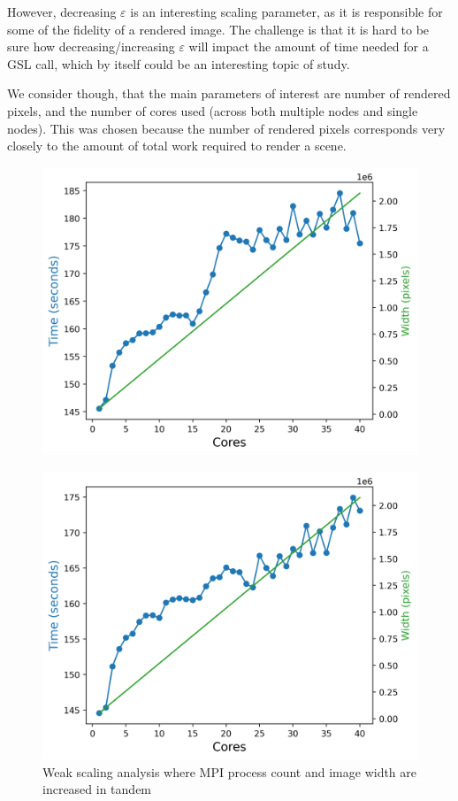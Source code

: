 However, decreasing $\varepsilon$ is an interesting scaling parameter, as it is responsible for some of the fidelity of a rendered image. The challenge is that it is hard to be sure how decreasing/increasing $\varepsilon$ will impact the amount of time needed for a GSL call, which by itself could be an interesting topic of study.

We consider though, that the main parameters of interest are number of rendered pixels, and the number of cores used (across both multiple nodes and single nodes). This was chosen because the number of rendered pixels corresponds very closely to the amount of total work required to render a scene.

\begin{figure}[h]
  \centering
 \begin{minipage}{0.45\linewidth}
  \includegraphics[width=\linewidth]{figs/mpi_weak2.out}
 \caption{Weak scaling analysis where MPI process count and image width are increased in tandem  }
    \label{fig:mpi_weak2}
    \end{minipage}
  \hspace{.05\linewidth}
  \begin{minipage}{0.45\linewidth}
      \includegraphics[width=\linewidth]{figs/omp_weak2.out}

\end{minipage}
\end{figure}
